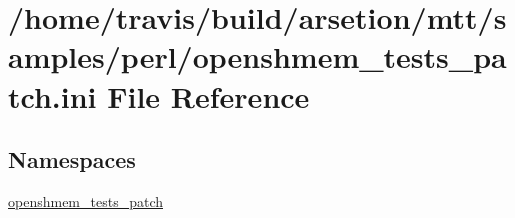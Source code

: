 \hypertarget{openshmem__tests__patch_8ini}{\section{/home/travis/build/arsetion/mtt/samples/perl/openshmem\-\_\-tests\-\_\-patch.ini File Reference}
\label{openshmem__tests__patch_8ini}
}
\subsection*{Namespaces}
\begin{DoxyCompactItemize}
\item 
\hyperlink{namespaceopenshmem__tests__patch}{openshmem\-\_\-tests\-\_\-patch}
\end{DoxyCompactItemize}
